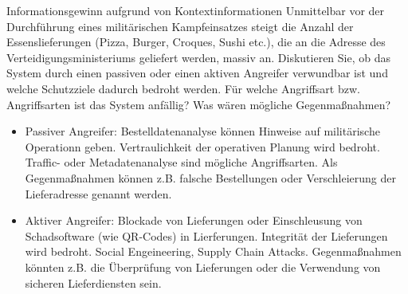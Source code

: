 \documentclass{article}
\begin{document}
\setcounter{subsection}{34}
\begin{exercise}{Informationsgewinn aufgrund von Kontextinformationen}
  Unmittelbar vor der Durchführung eines militärischen Kampfeinsatzes steigt die Anzahl der Essenslieferungen (Pizza, Burger, Croques, Sushi etc.), die an die Adresse des Verteidigungsministeriums geliefert werden, massiv an. Diskutieren Sie, ob das System durch einen passiven oder einen aktiven Angreifer verwundbar ist und welche Schutzziele dadurch bedroht werden. Für welche Angriffsart bzw. Angriffsarten ist das System anfällig? Was wären mögliche Gegenmaßnahmen?

  \begin{solution}
    \begin{itemize}
      \item Passiver Angreifer: Bestelldatenanalyse können Hinweise auf militärische Operationn geben. Vertraulichkeit der operativen Planung wird bedroht. Traffic- oder Metadatenanalyse sind mögliche Angriffsarten. Als Gegenmaßnahmen können z.B. falsche Bestellungen oder Verschleierung der Lieferadresse genannt werden.
      \item Aktiver Angreifer: Blockade von Lieferungen oder Einschleusung von Schadsoftware (wie QR-Codes) in Lierferungen. Integrität der Lieferungen wird bedroht. Social Engeineering, Supply Chain Attacks. Gegenmaßnahmen könnten z.B. die Überprüfung von Lieferungen oder die Verwendung von sicheren Lieferdiensten sein.
    \end{itemize}
  \end{solution}
\end{exercise}
\end{document}
